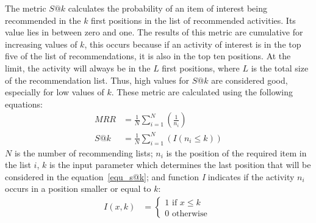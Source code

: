 \documentclass{doublecol-new}
\theoremstyle{TH}{
\newtheorem{lemma}{Lemma}
\newtheorem{theorem}[lemma]{Theorem}
\newtheorem{corrolary}[lemma]{Corrolary}
\newtheorem{conjecture}[lemma]{Conjecture}
\newtheorem{proposition}[lemma]{Proposition}
\newtheorem{claim}[lemma]{Claim}
\newtheorem{stheorem}[lemma]{Wrong Theorem}
\newtheorem{algorithm}{Algorithm}
}
\theoremstyle{THrm}{
\newtheorem{definition}{Definition}[section]
\newtheorem{question}{Question}[section]
\newtheorem{remark}{Remark}
\newtheorem{scheme}{Scheme}
}
\theoremstyle{THhit}{
\newtheorem{case}{Case}[section]
}
\begin{document}
The metric \(S@k\) calculates the probability of an item of interest being recommended in the \(k\) first positions in the list of recommended activities. Its value ​​lies in between zero and one. The results of this metric are cumulative for increasing values ​​of \(k\), this occurs because if an activity of interest is in the top five of the list of recommendations, it is also in the top ten positions. At the limit, the activity will always be in the \(L\) first positions, where \(L\) is the total size of the recommendation list. Thus, high values ​​for $S@k$ are considered good, especially for low values ​​of $k$. These metric are calculated using the following equations:
\begin{align}
	MRR &= \frac{1}{N} \sum\limits_{i=1}^{N} \left( \frac{1}{n_{i}} \right) 		\label{equ_mrr}\\
	S@k &= \frac{1}{N} \sum\limits_{i=1}^{N} \left( I(n_{i} \leq k) \right)			\label{equ_s@k}
\end{align}
\(N\) is the number of recommending lists; \(n_{i}\) is the position of the required item in the list \(i\), \(k\) is the input parameter which determines the last position that will be considered in the equation~\eqref{equ_s@k}; and function \emph{I} indicates if the activity \(n_{i}\) occurs in a position smaller or equal to \(k\):
\begin{align}
	I(x, k)   &= \begin{cases} \label{equ_indicativa}
		1 \textrm{ if } x \leq k \\
		0 \textrm{ otherwise }
	\end{cases}
\end{align}

\end{document}
